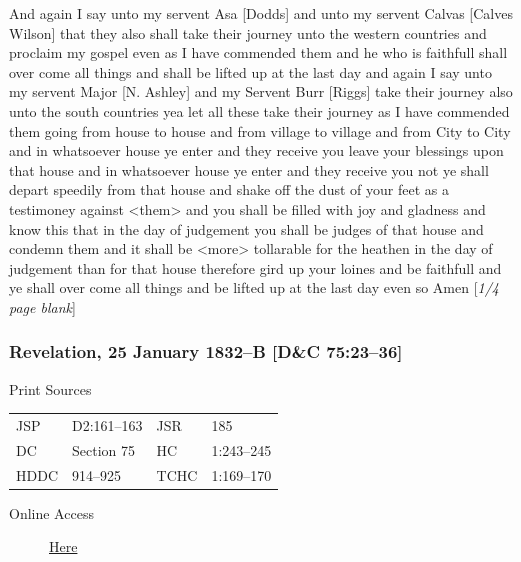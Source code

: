 				And again I say unto my servent Asa [Dodds] and unto my servent Calvas [Calves Wilson] that they also shall take their journey unto the western countries and proclaim my gospel even as I have commended them and he who is faithfull shall over come all things and shall be lifted up at the last day and again I say unto my servent Major [N. Ashley] and my Servent Burr [Riggs] take their journey also unto the south countries yea let all these take their journey as I have commended them going from house to house and from village to village and from City to City and in whatsoever house ye enter and they receive you leave your blessings upon that house and in whatsoever house ye enter and they receive you not ye shall depart speedily from that house and shake off the dust of your feet as a testimoney against <them> and you shall be filled with joy and gladness and know this that in the day of judgement you shall be judges of that house and condemn them and it shall be <more> tollarable for the heathen in the day of judgement than for that house therefore gird up your loines and be faithfull and ye shall over come all things and be lifted up at the last day even so Amen [\textit{1/4 page blank}]
				
		\subsubsection{Revelation, 25 January 1832--B [D\&C 75:23--36]}
			\label{EMS-1832-JS-25-JAN-1832-B}
		
			\begin{description}
				\item[Print Sources]
			\end{description}

				\begin{tabular}{p{0.5in}p{1in}p{0.5in}p{1in}}
				JSP	 	& D2:161--163	& JSR 		& 185 \\
				DC	 	& Section 75 	& HC 		& 1:243--245 \\
				HDDC 	& 914--925		& TCHC 		& 1:169--170 \\
				\end{tabular}
			
			\begin{description}
				\item[Online Access] \href{https://www.josephsmithpapers.org/paper-summary/revelation-25-january-1832-b-dc-7523-36/1}{Here}
			\end{description}
			
